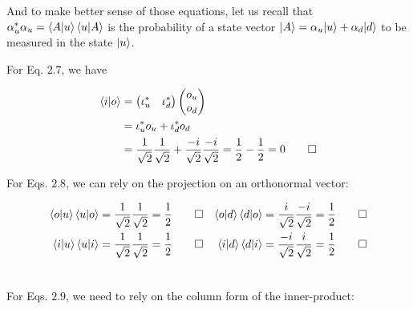 \documentclass[solutions.tex]{subfiles}
\begin{document}
And to make better sense of those equations, let us recall
that $\alpha_u^*\alpha_u = \left\langle A \middle| u \right\rangle\left\langle u \middle| A \right\rangle$ is the
probability of a state vector $|A\rangle = \alpha_u|u\rangle+
\alpha_d|d\rangle$ to be measured in the state $|u\rangle$.

For Eq. $2.7$, we have

\begin{align*}
\left\langle i \middle| o \right\rangle &=
\begin{pmatrix}
\iota_u^* & \iota_d^* \\
\end{pmatrix}
\begin{pmatrix}
o_u \\
o_d \\
\end{pmatrix} \\
~ &= \iota_u^*o_u + \iota_d^*o_d \\
~ &= \frac1{\sqrt2}\frac1{\sqrt2} + \frac{-i}{\sqrt2}\frac{-i}{\sqrt2}
 = \frac1{2}-\frac{1}{2} = 0 \qed \\
\end{align*}

For Eqs. $2.8$, we can rely on the projection on an orthonormal vector:

\begin{align*}
\left\langle o \middle| u \right\rangle\left\langle u \middle| o \right\rangle &= \frac1{\sqrt2}\frac1{\sqrt2}
= \frac1{2} \qed &
\left\langle o \middle| d \right\rangle\left\langle d \middle| o \right\rangle &= \frac{i}{\sqrt2}\frac{-i}{\sqrt2}
= \frac1{2} \qed \\
\left\langle i \middle| u \right\rangle\left\langle u \middle| i \right\rangle &= \frac1{\sqrt2}\frac1{\sqrt2}
= \frac1{2} \qed &
\left\langle i \middle| d \right\rangle\left\langle d \middle| i \right\rangle &= \frac{-i}{\sqrt2}\frac{i}{\sqrt2}
= \frac1{2} \qed \\
~ & ~ \\
\end{align*}

For Eqs. $2.9$, we need to rely on the column form of the inner-product:
\end{document}

